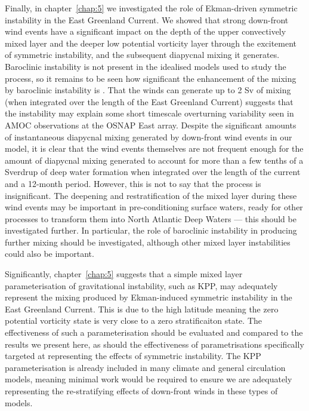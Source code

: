 Finally, in chapter~\ref{chap:5} we investigated the role of Ekman-driven symmetric instability in the East Greenland Current. We showed that strong down-front wind events have a significant impact on the depth of the upper convectively mixed layer and the deeper low potential vorticity layer through the excitement of symmetric instability, and the subsequent diapycnal mixing it generates. Baroclinic instability is not present in the idealised models used to study the process, so it remains to be seen how significant the enhancement of the mixing by baroclinic instability is \citep{Spall2016}.
That the winds can generate up to 2 Sv of mixing (when integrated over the length of the East Greenland Current) suggests that the instability may explain some short timescale overturning variability seen in AMOC observations at the OSNAP East array. Despite the significant amounts of instantaneous diapycnal mixing generated by down-front wind events in our model, it is clear that the wind events themselves are not frequent enough for the amount of diapycnal mixing generated to account for more than a few tenths of a Sverdrup of deep water formation when integrated over the length of the current and a 12-month period. However, this is not to say that the process is insignificant. The deepening and restratification of the mixed layer during these wind events may be important in pre-conditioning surface waters, ready for other processes to transform them into North Atlantic Deep Waters --- this should be investigated further. In particular, the role of baroclinic instability in producing further mixing should be investigated, although other mixed layer instabilities could also be important.

Significantly, chapter~\ref{chap:5} suggests that a simple mixed layer parameterisation of gravitational instability, such as KPP, may adequately represent the mixing produced by Ekman-induced symmetric instability in the East Greenland Current. This is due to the high latitude meaning the zero potential vorticity state is very close to a zero stratificaiton state. The effectiveness of such a parameterisation should be evaluated and compared to the results we present here, as should the effectiveness of parametrisations specifically targeted at representing the effects of symmetric instability. The KPP parameterisation is already included in many climate and general circulation models, meaning minimal work would be required to ensure we are adequately representing the re-stratifying effects of down-front winds in these types of models.

